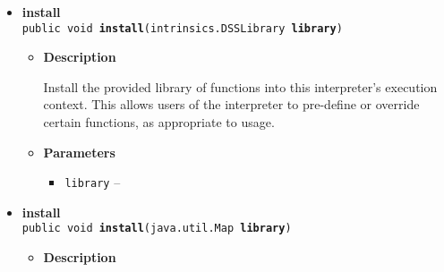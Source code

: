 {{{{\begin{itemize}
{\begin{itemize}
{Associate a constant value with the specified name. This is used to define constants such as patient id Supplied values may be common Java objects (including Long, Double, String) and will be converted where possible to appropriate types for usage in the DSS subsystem.
}
\item{
{\bf  Parameters}
  \begin{itemize}
   \item{
\texttt{name} -- }
   \item{
\texttt{value} -- }
  \end{itemize}
}%
\end{itemize}
}%
\item{ 
\hypertarget{org.openmrs.module.dssmodule.DSSInterpreter.install(org.openmrs.module.dssmodule.intrinsics.DSSLibrary)}{{\bf  install}\\}
\texttt{public void\ {\bf  install}(\texttt{intrinsics.DSSLibrary} {\bf  library})
\label{org.openmrs.module.dssmodule.DSSInterpreter.install(org.openmrs.module.dssmodule.intrinsics.DSSLibrary)}}%
\begin{itemize}
\item{
{\bf  Description}

Install the provided library of functions into this interpreter's execution context. This allows users of the interpreter to pre-define or override certain functions, as appropriate to usage.
}
\item{
{\bf  Parameters}
  \begin{itemize}
   \item{
\texttt{library} -- }
  \end{itemize}
}%
\end{itemize}
}%
\item{ 
\hypertarget{org.openmrs.module.dssmodule.DSSInterpreter.install(java.util.Map)}{{\bf  install}\\}
\texttt{public void\ {\bf  install}(\texttt{java.util.Map} {\bf  library})
\label{org.openmrs.module.dssmodule.DSSInterpreter.install(java.util.Map)}}%
\begin{itemize}
\item{
{\bf  Description}

}
\end{itemize}}
\end{itemize}}}}}
